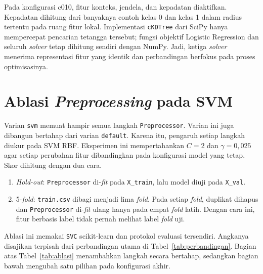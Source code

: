 Pada konfigurasi c010, fitur konteks, jendela, dan kepadatan diaktifkan.
Kepadatan dihitung dari banyaknya contoh kelas 0 dan kelas 1 dalam radius
tertentu pada ruang fitur lokal. Implementasi \texttt{cKDTree} dari SciPy hanya
mempercepat pencarian tetangga tersebut; fungsi objektif Logistic Regression
dan seluruh \textit{solver} tetap dihitung sendiri dengan NumPy. Jadi, ketiga
\textit{solver} menerima representasi fitur yang identik dan perbandingan
berfokus pada proses optimisasinya.

\section{Ablasi \textit{Preprocessing} pada SVM}
\label{sec:ablasi}

Varian \texttt{svm} memuat hampir semua langkah \texttt{Preprocessor}. Varian
ini juga dibangun bertahap dari varian \texttt{default}. Karena itu, pengaruh
setiap langkah diukur pada SVM RBF. Eksperimen ini mempertahankan $C=2$ dan
$\gamma=0{,}025$ agar setiap perubahan fitur dibandingkan pada konfigurasi model
yang tetap. Skor dihitung dengan dua cara.
\begin{enumerate}
	\item \textit{Hold-out}: \texttt{Preprocessor} di-\textit{fit} pada
	\texttt{X\_train}, lalu model diuji pada \texttt{X\_val}.
	\item 5-\textit{fold}: \texttt{train.csv} dibagi menjadi lima \textit{fold}.
	Pada setiap \textit{fold}, duplikat dihapus dan \texttt{Preprocessor}
	di-\textit{fit} ulang hanya pada empat \textit{fold} latih. Dengan cara ini,
	fitur berbasis label tidak pernah melihat label \textit{fold} uji.
\end{enumerate}
Ablasi ini memakai \texttt{SVC} scikit-learn dan protokol evaluasi
tersendiri. Angkanya disajikan terpisah dari perbandingan utama di
Tabel~\ref{tab:perbandingan}. Bagian atas Tabel~\ref{tab:ablasi} menambahkan
langkah secara bertahap, sedangkan bagian bawah mengubah satu pilihan pada
konfigurasi akhir.

